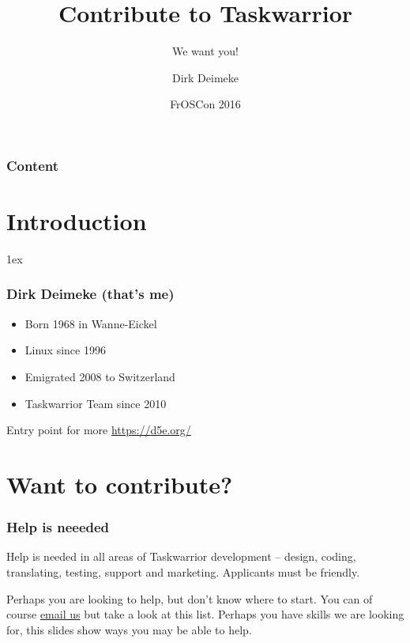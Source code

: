 \documentclass[t,handout]{beamer}
\title{Contribute to Taskwarrior}
\subtitle{We want you!}
\author[Deimeke, Dirk]{Dirk Deimeke}
\institute[Taskwarrior academy]{Taskwarrior academy}
\date{FrOSCon 2016}
\begin{document}
\begin{frame} %
	\titlepage
\end{frame}


\begin{frame}\frametitle{Content}
	\tableofcontents
\end{frame}

\section{Introduction}

\parskip1ex

\begin{frame}[fragile]\frametitle{Dirk Deimeke (that's me)}
    \vfill
    \begin{itemize}
        \item Born 1968 in Wanne-Eickel
        \item Linux since 1996
        \item Emigrated 2008 to Switzerland
        \item Taskwarrior Team since 2010
    \end{itemize}

    Entry point for more \url{https://d5e.org/}
\end{frame}

\section{Want to contribute?}

\begin{frame}[fragile]\frametitle{Help is neeeded}
    \vfill
    Help is needed in all areas of Taskwarrior development -- design, coding, translating, testing, support and marketing. Applicants must be friendly.

    Perhaps you are looking to help, but don't know where to start. You can of course \href{mailto:taskwarrior-dev@googlegroups.com}{email us} but take a look at this list. Perhaps you have skills we are looking for, this slides show ways you may be able to help.
    \vfill
\end{frame}
\end{document}
